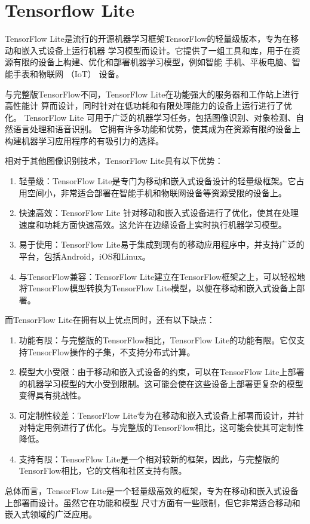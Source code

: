 %
%
%
%

\section{Tensorflow Lite}
TensorFlow Lite是流行的开源机器学习框架TensorFlow的轻量级版本，专为在移动和嵌入式设备上运行机器
学习模型而设计。它提供了一组工具和库，用于在资源有限的设备上构建、优化和部署机器学习模型，例如智能
手机、平板电脑、智能手表和物联网 （IoT） 设备。

与完整版TensorFlow不同，TensorFlow Lite在功能强大的服务器和工作站上进行高性能计
算而设计，同时针对在低功耗和有限处理能力的设备上运行进行了优化。
TensorFlow Lite 可用于广泛的机器学习任务，包括图像识别、对象检测、自然语言处理和语音识别。
它拥有许多功能和优势，使其成为在资源有限的设备上构建机器学习应用程序的有吸引力的选择。

相对于其他图像识别技术，TensorFlow Lite具有以下优势：
\begin{enumerate}
    \item 轻量级：TensorFlow Lite是专门为移动和嵌入式设备设计的轻量级框架。它占用空间小，非常适合部署在智能手机和物联网设备等资源受限的设备上。
    \item 快速高效：TensorFlow Lite 针对移动和嵌入式设备进行了优化，使其在处理速度和功耗方面快速高效。这允许在边缘设备上实时执行机器学习模型。
    \item 易于使用：TensorFlow Lite易于集成到现有的移动应用程序中，并支持广泛的平台，包括Android，iOS和Linux。
    \item 与TensorFlow兼容：TensorFlow Lite建立在TensorFlow框架之上，可以轻松地将TensorFlow模型转换为TensorFlow Lite模型，以便在移动和嵌入式设备上部署。
\end{enumerate}

而TensorFlow Lite在拥有以上优点同时，还有以下缺点：
\begin{enumerate}
    \item 功能有限：与完整版的TensorFlow相比，TensorFlow Lite的功能有限。它仅支持TensorFlow操作的子集，不支持分布式计算。
    \item 模型大小受限：由于移动和嵌入式设备的约束，可以在TensorFlow Lite上部署的机器学习模型的大小受到限制。这可能会使在这些设备上部署更复杂的模型变得具有挑战性。
    \item 可定制性较差：TensorFlow Lite专为在移动和嵌入式设备上部署而设计，并针对特定用例进行了优化。与完整版的TensorFlow相比，这可能会使其可定制性降低。
    \item 支持有限：TensorFlow Lite是一个相对较新的框架，因此，与完整版的TensorFlow相比，它的文档和社区支持有限。
\end{enumerate}
总体而言，TensorFlow Lite是一个轻量级高效的框架，专为在移动和嵌入式设备上部署而设计。虽然它在功能和模型
尺寸方面有一些限制，但它非常适合移动和嵌入式领域的广泛应用。

